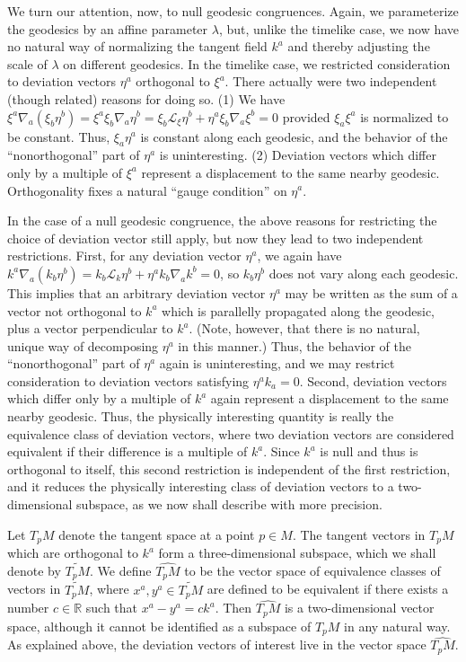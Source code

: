 We turn our attention, now, to null geodesic congruences. Again, we parameterize
the geodesics by an affine parameter \(\lambda\), but, unlike the timelike case, we now
have no natural way of normalizing the tangent field \(k^a\) and thereby adjusting the
scale of \(\lambda\) on different geodesics. In the timelike case, we restricted
consideration to deviation vectors \(\eta^a\) orthogonal to \(\xi^a\). There actually were
two independent (though related) reasons for doing so. (1) We have
\(\xi^a\nabla_a(\xi_b\eta^b)=\xi^a\xi_b\nabla_a\eta^b
=\xi_b\mathcal L_\xi\eta^b+\eta^a\xi_b\nabla_a\xi^b=0\)
provided \(\xi_a\xi^a\) is normalized to be constant. Thus, \(\xi_a\eta^a\) is constant
along each geodesic, and the behavior of the ``nonorthogonal'' part of \(\eta^a\) is
uninteresting. (2) Deviation vectors which differ only by a multiple of \(\xi^a\)
represent a displacement to the same nearby geodesic. Orthogonality fixes a natural
``gauge condition'' on \(\eta^a\).

In the case of a null geodesic congruence, the above reasons for restricting the
choice of deviation vector still apply, but now they lead to two independent
restrictions. First, for any deviation vector \(\eta^a\), we again have
\(k^a\nabla_a(k_b\eta^b)=k_b\mathcal L_k\eta^b+\eta^ak_b\nabla_ak^b=0\), so
\(k_b\eta^b\) does not vary along each geodesic. This implies that an arbitrary
deviation vector \(\eta^a\) may be written as the sum of a vector not orthogonal to
\(k^a\) which is parallelly propagated along the geodesic, plus a vector perpendicular
to \(k^a\). (Note, however, that there is no natural, unique way of decomposing
\(\eta^a\) in this manner.) Thus, the behavior of the ``nonorthogonal'' part of \(\eta^a\)
again is uninteresting, and we may restrict consideration to deviation vectors
satisfying \(\eta^ak_a=0\). Second, deviation vectors which differ only by a multiple
of \(k^a\) again represent a displacement to the same nearby geodesic. Thus, the
physically interesting quantity is really the equivalence class of deviation vectors,
where two deviation vectors are considered equivalent if their difference is a multiple
of \(k^a\). Since \(k^a\) is null and thus is orthogonal to itself, this second restriction
is independent of the first restriction, and it reduces the physically interesting class
of deviation vectors to a two-dimensional subspace, as we now shall describe with
more precision.

Let \(T_pM\) denote the tangent space at a point \(p\in M\). The tangent vectors in
\(T_pM\) which are orthogonal to \(k^a\) form a three-dimensional subspace, which
we shall denote by \(\widetilde{T_pM}\). We define \(\widehat{T_pM}\) to be the vector
space of equivalence classes of vectors in \(\widetilde{T_pM}\), where
\(x^a,y^a\in\widetilde{T_pM}\) are defined to be equivalent if there exists a number
\(c\in\mathbb R\) such that \(x^a-y^a=ck^a\). Then \(\widehat{T_pM}\) is a
two-dimensional vector space, although it cannot be identified as a subspace of
\(T_pM\) in any natural way. As explained above, the deviation vectors of interest
live in the vector space \(\widehat{T_pM}\).

